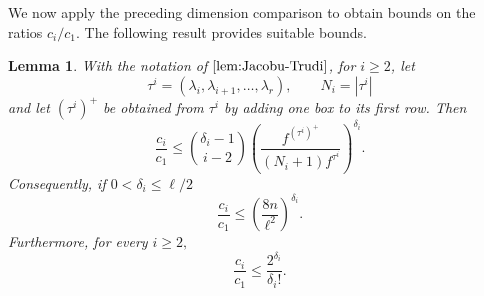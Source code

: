 \documentclass[12pt]{article}
\newtheorem{lemma}{Lemma}[section]
\theoremstyle{definition}
\newcommand{\1}{\mathbf 1}
\begin{document}
We now apply the preceding dimension comparison to obtain bounds on the ratios $c_i/c_1$.  The following result provides suitable bounds. 

\begin{lemma}\label{lem:bound for c_i/c_1}
    With the notation of $\Cref{lem:Jacobu-Trudi}$, for $i\geq 2$, let
    $$\tau^i=(\lambda_i,\lambda_{i+1},\ldots,\lambda_r), \qquad N_i=|\tau^i|$$
    and let $(\tau^i)^+$ be obtained from $\tau^i$ by adding one box to its first row. Then
    $$\frac{c_i}{c_1}\leq \binom{\delta_i-1}{i-2}\left(\frac{f^{(\tau^i)^+}}{(N_i+1)f^{\tau^i}}\right)^{\delta_i}.$$
    Consequently, if $0<\delta_i\leq \ell/2$
    $$\frac{c_i}{c_1}\leq \left(\frac{8n}{\ell^2}\right)^{\delta_i}.$$
    Furthermore, for every $i\geq 2,$
    $$\frac{c_i}{c_1}\leq \frac{2^{\delta_i}}{\delta_i!}.$$
\end{lemma}
\end{document}

